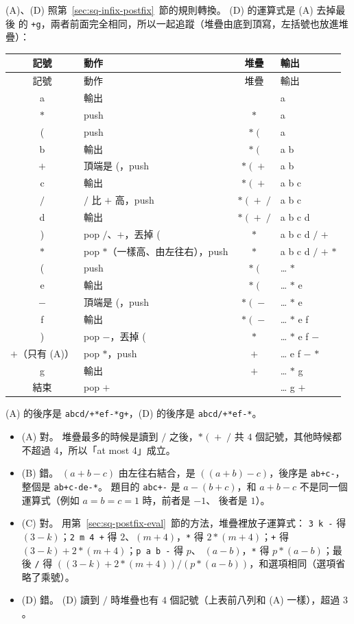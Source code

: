 (A)、(D) 照第~\ref{sec:sq-infix-postfix}~節的規則轉換。 (D) 的運算式是 (A) 去掉最後
的 \texttt{+g}，兩者前面完全相同，所以一起追蹤（堆疊由底到頂寫，左括號也放進堆疊）：
{\small
\begin{longtable}{clcl}
\toprule
記號 & 動作 & 堆疊 & 輸出 \\
\midrule
\endfirsthead
\toprule
記號 & 動作 & 堆疊 & 輸出 \\
\midrule
\endhead
a & 輸出 & & a \\
$*$ & push & $*$ & a \\
( & push & $*\;($ & a \\
b & 輸出 & $*\;($ & a b \\
$+$ & 頂端是 (，push & $*\;(\;+$ & a b \\
c & 輸出 & $*\;(\;+$ & a b c \\
$/$ & $/$ 比 $+$ 高，push & $*\;(\;+\;/$ & a b c \\
d & 輸出 & $*\;(\;+\;/$ & a b c d \\
) & pop $/$、$+$，丟掉 ( & $*$ & a b c d $/$ $+$ \\
$*$ & pop $*$（一樣高、由左往右），push & $*$ & a b c d $/$ $+$ $*$ \\
( & push & $*\;($ & \ldots{} $*$ \\
e & 輸出 & $*\;($ & \ldots{} $*$ e \\
$-$ & 頂端是 (，push & $*\;(\;-$ & \ldots{} $*$ e \\
f & 輸出 & $*\;(\;-$ & \ldots{} $*$ e f \\
) & pop $-$，丟掉 ( & $*$ & \ldots{} $*$ e f $-$ \\
\midrule
$+$（只有 (A)）& pop $*$，push & $+$ & \ldots{} e f $-$ $*$ \\
g & 輸出 & $+$ & \ldots{} $*$ g \\
結束 & pop $+$ & & \ldots{} g $+$ \\
\bottomrule
\end{longtable}}
(A) 的後序是 \texttt{abcd/+*ef-*g+}，(D) 的後序是 \texttt{abcd/+*ef-*}。

\begin{itemize}
\item (A) 對。 堆疊最多的時候是讀到 $/$ 之後，$*\;(\;+\;/$ 共 $4$ 個記號，其他時候都
不超過 $4$，所以「at most 4」成立。
\item (B) 錯。 $(a + b - c)$ 由左往右結合，是 $((a + b) - c)$，後序是
\texttt{ab+c-}，整個是 \texttt{ab+c-de-*}。 題目的 \texttt{abc+-} 是
$a - (b + c)$，和 $a + b - c$ 不是同一個運算式（例如 $a = b = c = 1$ 時，前者是 $-1$、
後者是 $1$）。
\item (C) 對。 用第~\ref{sec:sq-postfix-eval}~節的方法，堆疊裡放子運算式：
\texttt{3 k -} 得 $(3 - k)$；\texttt{2 m 4 +} 得 $2$、$(m + 4)$，\texttt{*} 得
$2 * (m + 4)$；\texttt{+} 得 $(3 - k) + 2 * (m + 4)$；\texttt{p a b -} 得 $p$、
$(a - b)$，\texttt{*} 得 $p * (a - b)$；最後 \texttt{/} 得
$((3 - k) + 2 * (m + 4)) / (p * (a - b))$，和選項相同（選項省略了乘號）。
\item (D) 錯。 (D) 讀到 $/$ 時堆疊也有 $4$ 個記號（上表前八列和 (A) 一樣），超過 $3$。
\end{itemize}

